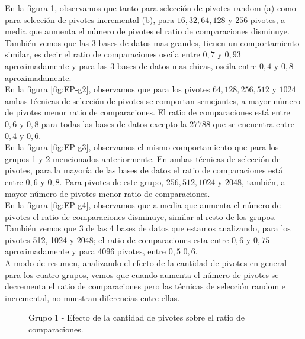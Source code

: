 En la figura \ref{fig:EP-g1}, observamos que tanto para selecci\'on de pivotes random (a) como para selecci\'on de pivotes incremental (b), para $16, 32, 64, 128$ y $256$ pivotes, a media que aumenta el n\'umero de pivotes el ratio de comparaciones disminuye. Tambi\'en vemos que las 3 bases de datos mas grandes, tienen un comportamiento similar, es decir el ratio de comparaciones oscila entre $0,7$ y $0,93$ aproximadamente y para las 3 bases de datos mas chicas, oscila entre $0,4$ y $0,8$ aproximadamente.\\

En la figura \ref{fig:EP-g2}, observamos que para los pivotes $64, 128, 256, 512$ y $1024$ ambas t\'ecnicas de selecci\'on de pivotes se comportan semejantes, a mayor n\'umero de pivotes menor ratio de comparaciones. El ratio de comparaciones est\'a entre $0,6$ y $0,8$ para todas las bases de datos excepto la $27788$ que se encuentra entre $0,4$ y $0,6$.\\

En la figura \ref{fig:EP-g3}, observamos el mismo comportamiento que para los grupos 1 y 2 mencionados anteriormente. En ambas t\'ecnicas de selecci\'on de pivotes, para la mayor\'ia de las bases de datos el ratio de comparaciones est\'a entre $0,6$ y $0,8$. Para pivotes de este grupo, $256, 512, 1024$ y $2048$, tambi\'en, a mayor n\'umero de pivotes menor ratio de comparaciones.\\

En la figura \ref{fig:EP-g4}, observamos que a media que aumenta el n\'umero de pivotes el ratio de comparaciones disminuye, similar al resto de los grupos. Tambi\'en vemos que 3 de las 4 bases de datos que estamos analizando, para los pivotes 512, 1024 y 2048; el ratio de comparaciones esta entre $0,6$ y $0,75$ aproximadamente y para 4096 pivotes, entre $0,5$ $0,6$.\\

A modo de resumen, analizando el efecto de la cantidad de pivotes en general para los cuatro grupos, vemos que cuando aumenta el n\'umero de pivotes se decrementa el ratio de comparaciones pero las t\'ecnicas de selecci\'on random e incremental, no muestran diferencias entre ellas.

\begin{figure}[H]
\centering
{}
		\caption{\small Grupo 1 - Efecto de la cantidad de pivotes sobre el ratio de comparaciones.}
		\label{fig:EP-g1}
\end{figure}

